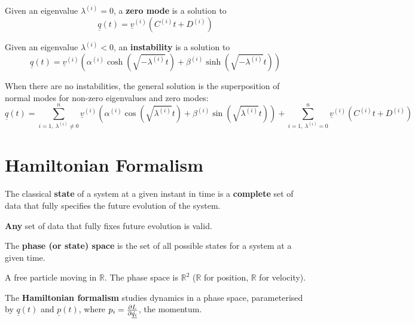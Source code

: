 \begin{definition}
	Given an eigenvalue $\lambda^{(i)} = 0$, a \textbf{zero mode} is a solution to
	\[
		\underline{q}(t) = \underline{v}^{(i)} \left( C^{(i)} t + D^{(i)} \right)
	\]
\end{definition}

\begin{definition}
	Given an eigenvalue $\lambda^{(i)} < 0$, an \textbf{instability} is a solution to
	\[
		\underline{q}(t) = \underline{v}^{(i)} \left( \alpha^{(i)} \cosh(\sqrt{-\lambda^{(i)}} t) + \beta^{(i)} \sinh(\sqrt{-\lambda^{(i)}} t) \right)
	\]
\end{definition}

\begin{definition}
	When there are no instabilities, the general solution is the superposition of normal modes for non-zero eigenvalues and zero modes:
	\[
		\underline{q}(t) = \sum_{i = 1, \ \lambda^{(i)} \ne 0}^{n} \underline{v}^{(i)} \left( \alpha^{(i)} \cos(\sqrt{\lambda^{(i)}} t) + \beta^{(i)} \sin(\sqrt{\lambda^{(i)}} t) \right) + \sum_{i = 1, \ \lambda^{(i)} = 0}^{n} \underline{v}^{(i)} \left( C^{(i)} t + D^{(i)} \right)
	\]
\end{definition}

\section{Hamiltonian Formalism}

\begin{definition}
	The classical \textbf{state} of a system at a given instant in time is a \textbf{complete} set of data that fully specifies the future evolution of the system.
\end{definition}

\begin{remark}
	\textbf{Any} set of data that fully fixes future evolution is valid.
\end{remark}

\begin{definition}
	The \textbf{phase (or state) space} is the set of all possible states for a system at a given time.
\end{definition}

\begin{example}
	A free particle moving in $\mathbb{R}$. The phase space is $\mathbb{R}^2$ ($\mathbb{R}$ for position, $\mathbb{R}$ for velocity).
\end{example}

\begin{definition}
	The \textbf{Hamiltonian formalism} studies dynamics in a phase space, parameterised by $\underline{q}(t)$ and $\underline{p}(t)$, where $p_i = \diffp{L}{\dot{\underline{q_i}}}$, the momentum.
\end{definition}

